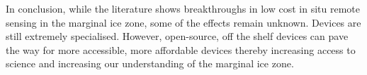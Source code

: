 In conclusion, while the literature shows breakthroughs in low cost in situ remote sensing in the marginal ice zone, some of the effects remain unknown. Devices are still extremely specialised. However, open-source, off the shelf devices can pave the way for more accessible, more affordable devices thereby increasing access to science and increasing our understanding of the marginal ice zone.
